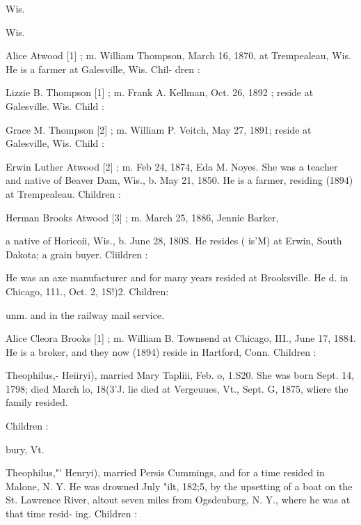 \documentclass[oneside]{book}
\begin{document}
Wis. 


Wis. 

Alice Atwood [1] ; m. William Thompson, March 16, 1870, at 
Trempealeau, Wis. He is a farmer at Galesville, Wis. Chil- 
dren : 










Lizzie B. Thompson [1] ; m. Frank A. Kellman, Oct. 26, 1892 ; 
reside at Galesville. Wis. Child : 

Grace M. Thompson [2] ; m. William P. Veitch, May 27, 1891; 
reside at Galesville, Wis. Child : 


Erwin Luther Atwood [2] ; m. Feb 24, 1874, Eda M. Noyes. 
She was a teacher and native of Beaver Dam, Wis., b. May 
21, 1850. He is a farmer, residing (1894) at Trempealeau. 
Children : 











Herman Brooks Atwood [3] ; m. March 25, 1886, Jennie Barker, 




a native of Horicoii, Wis., b. June 28, 180S. He resides ( is'M) 
at Erwin, South Dakota; a grain buyer. Cliildren : 




He was an axe manufacturer and for many years resided at 
Brooksville. He d. in Chicago, 111., Oct. 2, 1S!)2. Children: 



unm. and in the railway mail service. 

Alice Cleora Brooks [1] ; m. William B. Townsend at Chicago, 
III., June 17, 1884. He is a broker, and they now (1894) reside 
in Hartford, Conn. Children : 




Theophilus,- Heiiryi), married Mary Tapliii, Feb. o, 1.S20. She 
was born Sept. 14, 1798; died March lo, 18(3'J. lie died at 
Vergeuues, Vt., Sept. G, 1875, wliere the family resided. 

Children : 




bury, Vt. 




Theophilus,"' Henryi), married Persis Cummings, and for a time 
resided in Malone, N. Y. He was drowned July "ilt, 182;5, by 
the upsetting of a boat on the St. Lawrence River, altout seven 
miles from Ogsdeuburg, N. Y., where he was at that time resid- 
ing. Children : 
\end{document}
